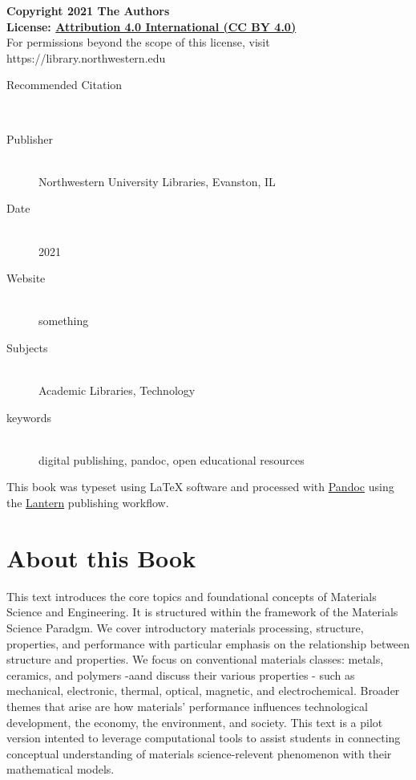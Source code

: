 \documentclass{book}
\newcommand{\booklicense}{\href{}{Attribution 4.0 International (CC BY 4.0)}}
\begin{document}
\begin{flushleft}

\textbf{Copyright \textcopyright{} 2021  The Authors\\
License: \booklicense}\\[11pt] 


For permissions beyond the scope of this license, visit https://library.northwestern.edu

\vspace*{\fill}

\begin{description}
  \item[Recommended Citation] \hfill \\ 
  \item[Publisher] \hfill \\ Northwestern University Libraries, Evanston, IL
  \item[Date] \hfill \\ 2021
    \item[Website] \hfill \\ something
          \item[Subjects] \hfill \\ Academic Libraries, Technology
  \item[keywords] \hfill \\ digital publishing, pandoc, open educational
resources
  
\end{description}


\vspace*{\fill}

This book was typeset using \LaTeX{} software and processed with \href{https://pandoc.org}{Pandoc} using the \href{http://lantern.northwestern.pub}{Lantern} publishing workflow.\\

\end{flushleft}

\addtocounter{page}{2}

\chapter*{About this Book}
This text introduces the core topics and foundational concepts of Materials
Science and Engineering. It is structured within the framework of the
Materials Science Paradgm. We cover introductory materials processing,
structure, properties, and performance with particular emphasis on the
relationship between structure and properties. We focus on conventional
materials classes: metals, ceramics, and polymers -aand discuss their various
properties - such as mechanical, electronic, thermal, optical, magnetic, and
electrochemical. Broader themes that arise are how materials' performance
influences technological development, the economy, the environment, and
society. This text is a pilot version intented to leverage computational tools
to assist students in connecting conceptual understanding of materials
science-relevent phenomenon with their mathematical models.
\end{document}
